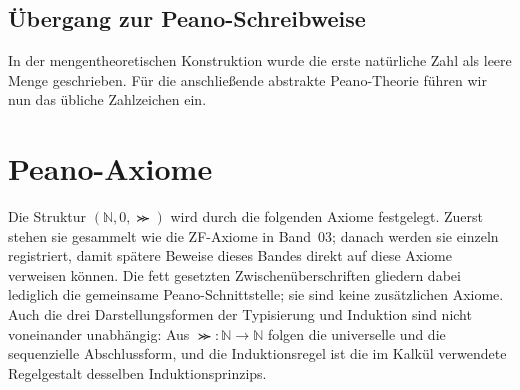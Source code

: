 \documentclass[main.tex]{subfiles}
\begin{document}

\section{Übergang zur Peano-Schreibweise}

In der mengentheoretischen Konstruktion wurde die erste natürliche Zahl als
leere Menge geschrieben. Für die anschließende abstrakte Peano-Theorie führen
wir nun das übliche Zahlzeichen ein.

\FormulaDefAuto[Nullzeichen]{0\coloneqq\varnothing}

\chapter{Peano-Axiome}

Die Struktur \((\mathbb{N},0,\Succ)\) wird durch die folgenden Axiome
festgelegt. Zuerst stehen sie gesammelt wie die ZF-Axiome in Band~03; danach
werden sie einzeln registriert, damit spätere Beweise dieses Bandes direkt
auf diese Axiome verweisen können. Die fett gesetzten Zwischenüberschriften
gliedern dabei lediglich die gemeinsame Peano-Schnittstelle; sie sind keine
zusätzlichen Axiome. Auch die drei Darstellungsformen der Typisierung und
Induktion sind nicht voneinander unabhängig: Aus
\(\Succ\colon\mathbb N\to\mathbb N\) folgen die universelle und die
sequenzielle Abschlussform, und die Induktionsregel ist die im Kalkül
verwendete Regelgestalt desselben Induktionsprinzips.
\end{document}
